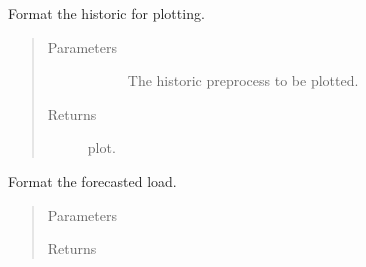 \documentclass[letterpaper,10pt,english]{sphinxmanual}
\begin{document}
\begin{fulllineitems}
\label{\detokenize{autoapi/src/plot/format/index:src.plot.format.format_history}}
Format the historic for plotting.
\begin{quote}\begin{description}
\item[{Parameters}] \leavevmode\begin{description}
\item[{}] \leavevmode
The historic preprocess to be plotted.

\end{description}

\item[{Returns}] \leavevmode\begin{description}
\item[{       plot.}] \leavevmode
\end{description}

\end{description}\end{quote}

\end{fulllineitems}


\begin{fulllineitems}
\label{\detokenize{autoapi/src/plot/format/index:src.plot.format.format_forecast}}
Format the forecasted load.
\begin{quote}\begin{description}
\item[{Parameters}] \leavevmode\begin{description}
\item[{}] \leavevmode
\end{description}

\item[{Returns}] \leavevmode\begin{description}
\item[{  }] \leavevmode
\end{description}

\end{description}\end{quote}

\end{fulllineitems}
\end{document}
